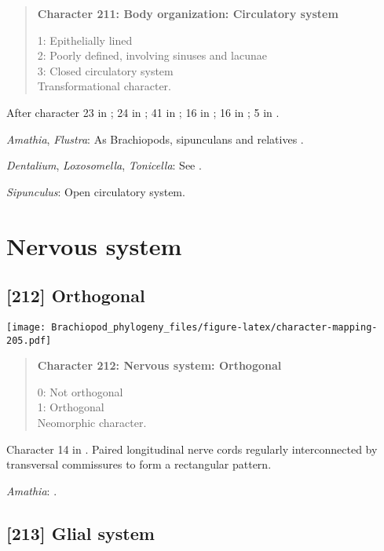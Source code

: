 \documentclass[openany]{book}
\theoremstyle{definition}
\theoremstyle{definition}
\theoremstyle{definition}
\theoremstyle{remark}
\begin{document}
\begin{quote}
\textbf{Character 211: Body organization: Circulatory system}

1: Epithelially lined\\
2: Poorly defined, involving sinuses and lacunae\\
3: Closed circulatory system\\
Transformational character.
\end{quote}

After character 23 in \citet{Haszprunar1996}; 24 in
\citet{Haszprunar2000}; 41 in \citet{Rouse1999}; 16 in
\citet{Scheltema1993}; 16 in \citet{Vinther2008}; 5 in
\citet{Haszprunar2008}.

\hypertarget{Amathia-coding-211}{}
\emph{Amathia}, \emph{Flustra}: As Brachiopods, sipunculans and
relatives \citep{Ruppert1983}.

\hypertarget{Dentalium-coding-211}{}
\emph{Dentalium}, \emph{Loxosomella}, \emph{Tonicella}: See
\citet{Haszprunar2008}.

\hypertarget{Sipunculus-coding-211}{}
\emph{Sipunculus}: Open circulatory system.

\section{Nervous system}\label{nervous-system}

\subsection*{{[}212{]} Orthogonal}\label{orthogonal}

\texttt{[image: Brachiopod\_phylogeny\_files/figure-latex/character-mapping-205.pdf]}

\begin{quote}
\textbf{Character 212: Nervous system: Orthogonal}

0: Not orthogonal\\
1: Orthogonal\\
Neomorphic character.
\end{quote}

Character 14 in \citet{Haszprunar1996}. Paired longitudinal nerve cords
regularly interconnected by transversal commissures to form a
rectangular pattern.

\hypertarget{Amathia-coding-212}{}
\emph{Amathia}: \citet{Temereva2016Thenervous}.

\subsection*{{[}213{]} Glial system}\label{glial-system}
\end{document}
